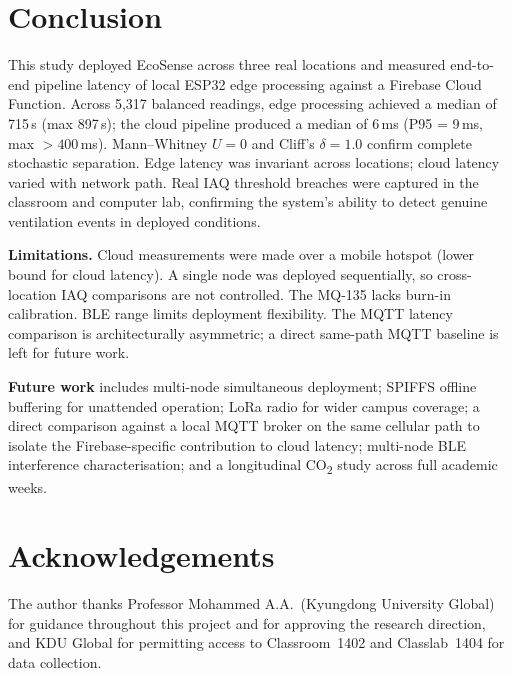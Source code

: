 \documentclass[12pt, a4paper]{article}
\newcommand{\us}{\,\textmu s}
\newcommand{\ms}{\,ms}
\begin{document}
\section{Conclusion}

This study deployed EcoSense across three real locations and measured
end-to-end pipeline latency of local ESP32 edge processing against a
Firebase Cloud Function. Across 5{,}317 balanced readings, edge
processing achieved a median of 715\us{} (max 897\us); the cloud
pipeline produced a median of 6\ms{} (P95 = 9\ms, max $> 400$\ms).
Mann--Whitney $U = 0$ and Cliff's $\delta = 1.0$ confirm complete
stochastic separation. Edge latency was invariant across locations;
cloud latency varied with network path. Real IAQ threshold breaches
were captured in the classroom and computer lab, confirming the
system's ability to detect genuine ventilation events in deployed
conditions.

\textbf{Limitations.} Cloud measurements were made over a mobile
hotspot (lower bound for cloud latency). A single node was deployed
sequentially, so cross-location IAQ comparisons are not controlled.
The MQ-135 lacks burn-in calibration. BLE range limits deployment
flexibility. The MQTT latency comparison is architecturally
asymmetric; a direct same-path MQTT baseline is left for future work.

\textbf{Future work} includes multi-node simultaneous deployment;
SPIFFS offline buffering for unattended operation; LoRa radio for
wider campus coverage; a direct comparison against a local MQTT broker
on the same cellular path to isolate the Firebase-specific contribution
to cloud latency; multi-node BLE interference characterisation; and a
longitudinal CO\textsubscript{2} study across full academic weeks.

\section*{Acknowledgements}

The author thanks Professor Mohammed A.A.\ (Kyungdong University
Global) for guidance throughout this project and for approving the
research direction, and KDU Global for permitting access to
Classroom~1402 and Classlab~1404 for data collection.
\end{document}
